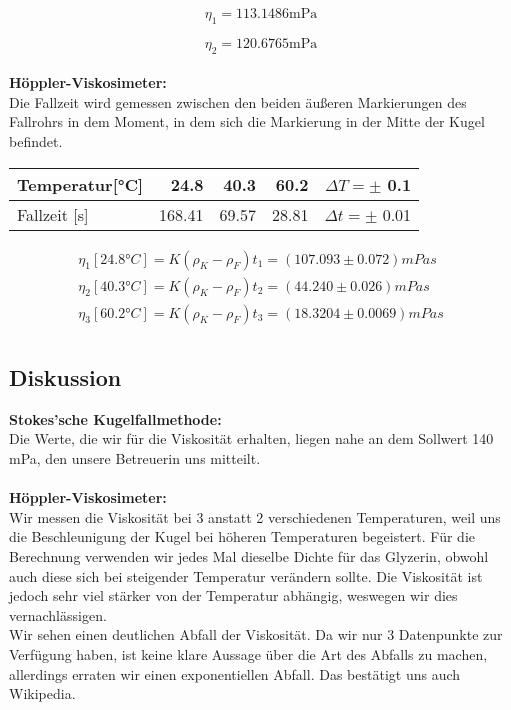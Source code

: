 \documentclass{article}
\begin{document}
$$  \eta_1 =   113.1486 \text{mPa} $$ 
 
$$  \eta_2 =   120.6765 \text{mPa} $$ \\
\textbf{Höppler-Viskosimeter:}\\
Die Fallzeit wird gemessen zwischen den beiden äußeren Markierungen des Fallrohrs in dem Moment, in dem sich die Markierung in der Mitte der Kugel befindet.\\
\begin{center}
\begin{tabular}{|l||r|r|r||r|}
\hline
Temperatur[°C] & 24.8 & 40.3 & 60.2 & $\Delta T=\pm$ 0.1\\
\hline
Fallzeit [s] & 168.41 & 69.57 &  28.81 & $\Delta t=\pm$ 0.01\\
\hline
\end{tabular}
\end{center}
\begin{gather*}
\eta_1[24.8°C] = K (\rho_K - \rho_F)t_1%
=(107.093 \pm 0.072) mPa s\\
\eta_2[40.3°C] = K (\rho_K - \rho_F)t_2%
= (44.240 \pm 0.026) mPa s\\
\eta_3[60.2°C] = K (\rho_K - \rho_F)t_3%
= (18.3204 \pm 0.0069) mPa s\\
\end{gather*}

\subsection{Diskussion}
\textbf{Stokes'sche Kugelfallmethode:}
\\
Die Werte, die wir für die Viskosität erhalten, liegen nahe an dem Sollwert 140 mPa, den unsere Betreuerin uns mitteilt. \\
\\
\textbf{Höppler-Viskosimeter:}\\
Wir messen die Viskosität bei 3 anstatt 2 verschiedenen Temperaturen, weil uns die Beschleunigung der Kugel bei höheren Temperaturen begeistert. Für die Berechnung verwenden wir jedes Mal dieselbe Dichte für das Glyzerin, obwohl auch diese sich bei steigender Temperatur verändern sollte. Die Viskosität ist jedoch sehr viel stärker von der Temperatur abhängig, weswegen wir dies vernachlässigen.\\
Wir sehen einen deutlichen Abfall der Viskosität. Da wir nur 3 Datenpunkte zur Verfügung haben, ist keine klare Aussage über die Art des Abfalls zu machen, allerdings erraten wir einen exponentiellen Abfall. Das bestätigt uns auch Wikipedia.\\
\end{document}
